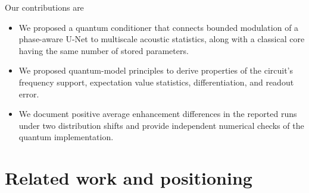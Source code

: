 \documentclass[10pt,a4paper]{article}
\begin{document}
Our contributions are 
\begin{itemize}
	\item We proposed a quantum conditioner that connects bounded modulation of a phase-aware U-Net to multiscale acoustic statistics, along with a classical core having the same number of stored parameters.
	\item We proposed quantum-model principles to derive properties of the circuit's frequency support, expectation value statistics, differentiation, and readout error.
	\item We document positive average enhancement differences in the reported runs under two distribution shifts and provide independent numerical checks of the quantum implementation.
\end{itemize}


\section{Related work and positioning}
\end{document}
